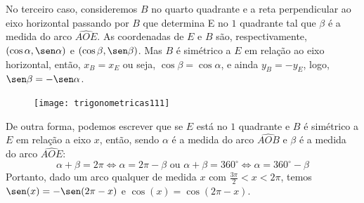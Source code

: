No terceiro caso, consideremos $B$ no quarto quadrante e a reta perpendicular ao eixo horizontal passando por $B$ que determina E no $1$ quadrante tal que $\beta$ é a medida do arco $\widehat{AOE}$. As coordenadas de $E$ e $B$ são, respectivamente, $(\cos\alpha, \sen\alpha)$ e $(\cos\beta, \sen\beta)$. Mas $B$ é simétrico a $E$ em relação ao eixo horizontal, então, $x_B = x_E$  ou seja, $\cos\beta = \cos\alpha$, e ainda $y_B= - y_E$, logo, $\sen\beta = - \sen\alpha$.

\begin{figure}[H]
\centering

\texttt{[image: trigonometricas111]}
\end{figure}

De outra forma, podemos escrever que se $E$ está no $1$ quadrante e $B$ é simétrico a $E$ em relação a eixo $x$, então, sendo $\alpha$ é a medida do arco $\widehat{AOB}$ e $\beta$ é a medida do arco $\widehat{AOE}$:
\begin{equation*}
\alpha+\beta=2\pi\iff\alpha=2\pi-\beta\text{ ou }\alpha+\beta=360^{\circ}\iff\alpha=360^{\circ}-\beta
\end{equation*}
Portanto, dado um arco qualquer de medida $x$ com  $\frac{3\pi}{2}<x<2\pi$, temos $\sen(x)= -\sen(2\pi-x)$  e $\cos(x)= \cos(2\pi-x)$.


